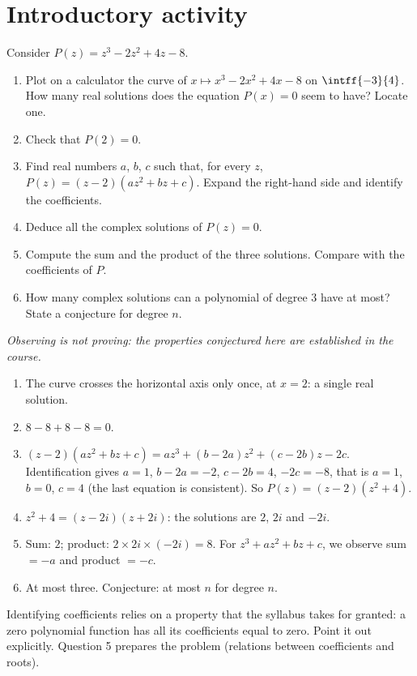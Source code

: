 \section{Introductory activity}
\begin{activity}
Consider $P(z)=z^3-2z^2+4z-8$.
\begin{enumerate}
\item Plot on a calculator the curve of $x\mapsto x^3-2x^2+4x-8$ on $\intff{-3}{4}$. How many real solutions does the equation $P(x)=0$ seem to have? Locate one.
\item Check that $P(2)=0$.
\item Find real numbers $a$, $b$, $c$ such that, for every $z$, $P(z)=(z-2)\left(az^2+bz+c\right)$. Expand the right-hand side and identify the coefficients.
\item Deduce all the complex solutions of $P(z)=0$.
\item Compute the sum and the product of the three solutions. Compare with the coefficients of $P$.
\item How many complex solutions can a polynomial of degree $3$ have at most? State a conjecture for degree $n$.
\end{enumerate}
\par\emph{Observing is not proving: the properties conjectured here are established in the course.}
\end{activity}
\begin{solution}[Activity]
\begin{enumerate}
\item The curve crosses the horizontal axis only once, at $x=2$: a single real solution.
\item $8-8+8-8=0$.
\item $(z-2)\left(az^2+bz+c\right)=az^3+(b-2a)z^2+(c-2b)z-2c$. Identification gives $a=1$, $b-2a=-2$, $c-2b=4$, $-2c=-8$, that is $a=1$, $b=0$, $c=4$ (the last equation is consistent). So $P(z)=(z-2)\left(z^2+4\right)$.
\item $z^2+4=(z-2i)(z+2i)$: the solutions are $2$, $2i$ and $-2i$.
\item Sum: $2$; product: $2\times2i\times(-2i)=8$. For $z^3+az^2+bz+c$, we observe sum $=-a$ and product $=-c$.
\item At most three. Conjecture: at most $n$ for degree $n$.
\end{enumerate}
\end{solution}
\begin{teachernote}
Identifying coefficients relies on a property that the syllabus takes for granted: a zero polynomial function has all its coefficients equal to zero. Point it out explicitly. Question 5 prepares the problem (relations between coefficients and roots).
\end{teachernote}

